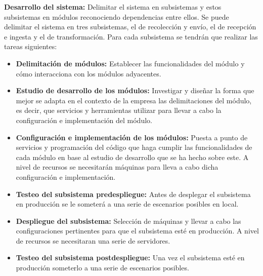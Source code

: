 \textbf{Desarrollo del sistema:} Delimitar el sistema en subsistemas y estos subsistemas en módulos reconociendo dependencias entre ellos. Se puede delimitar el sistema en tres subsistemas, el de recolección y envío, el de recepción e ingesta y el de transformación. Para cada subsistema se tendrán que realizar las tareas siguientes:
\begin{itemize}
	
	\item \textbf{Delimitación de módulos:} Establecer las funcionalidades del módulo y cómo interacciona con los módulos adyacentes.
	
	\item \textbf{Estudio de desarrollo de los módulos:} Investigar y diseñar la forma que mejor se adapta en el contexto de la empresa las delimitaciones del módulo, es decir, que servicios y herramientas utilizar para llevar a cabo la configuración e implementación del módulo.
	
	\item \textbf{Configuración e implementación de los módulos:} Puesta a punto de servicios y programación del código que haga cumplir las funcionalidades de cada módulo en base al estudio de desarrollo que se ha hecho sobre este. A nivel de recursos se necesitarán máquinas para lleva a cabo dicha configuración e implementación.
	
	\item \textbf{Testeo del subsistema predespliegue:} Antes de desplegar el subsistema en producción se le someterá a una serie de escenarios posibles en local.
	
	\item \textbf{Despliegue del subsistema:} Selección de máquinas y llevar a cabo las configuraciones pertinentes para que el subsistema esté en producción. A nivel de recursos se necesitaran una serie de servidores.
	
	\item \textbf{Testeo del subsistema postdespliegue:} Una vez el subsistema esté en producción someterlo a una serie de escenarios posibles.
	
\end{itemize}


